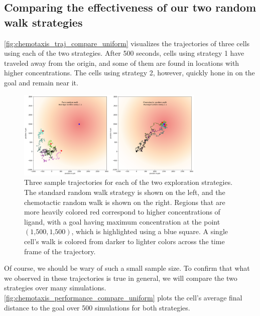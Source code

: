 \FloatBarrier
{}
\subsection{Comparing the effectiveness of our two random walk strategies}

\autoref{fig:chemotaxis_traj_compare_uniform} visualizes the trajectories of three cells using each of the two strategies. After 500 seconds, cells using strategy 1 have traveled away from the origin, and some of them are found in locations with higher concentrations. The cells using strategy 2, however, quickly hone in on the goal and remain near it.

\begin{figure}[h]
\centering
\mySfFamily
\includegraphics[width = 0.8\textwidth]{../images/chemotaxis_traj_compare_uniform.png}
\caption{Three sample trajectories for each of the two exploration strategies. The standard random walk strategy is shown on the left, and the chemotactic random walk is shown on the right. Regions that are more heavily colored red correspond to higher concentrations of ligand, with a goal having maximum concentration at the point $(\text{1,500}, \text{1,500})$, which is highlighted using a blue square. A single cell's walk is colored from darker to lighter colors across the time frame of the trajectory.}
\label{fig:chemotaxis_traj_compare_uniform}
\end{figure}


Of course, we should be wary of such a small sample size. To confirm that what we observed in these trajectories is true in general, we will compare the two strategies over many simulations. \autoref{fig:chemotaxis_performance_compare_uniform} plots the cell's average final distance to the goal over 500 simulations for both strategies.

